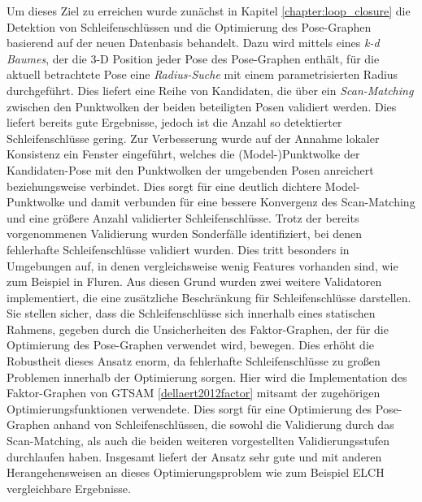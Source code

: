 Um dieses Ziel zu erreichen wurde zunächst in Kapitel \ref{chapter:loop_closure} die Detektion von Schleifenschlüssen und die Optimierung des Pose-Graphen basierend auf der neuen Datenbasis behandelt. Dazu wird mittels eines \emph{k-d Baumes}, der die 3-D Position jeder Pose des Pose-Graphen enthält, für die aktuell betrachtete Pose eine \emph{Radius-Suche} mit einem parametrisierten Radius durchgeführt. Dies liefert eine Reihe von Kandidaten, die über ein \emph{Scan-Matching} zwischen den Punktwolken der beiden beteiligten Posen validiert werden. Dies liefert bereits gute Ergebnisse, jedoch ist die Anzahl so detektierter Schleifenschlüsse gering. Zur Verbesserung wurde auf der Annahme lokaler Konsistenz ein Fenster eingeführt, welches die (Model-)Punktwolke der Kandidaten-Pose mit den Punktwolken der umgebenden Posen anreichert beziehungsweise verbindet. Dies sorgt für eine deutlich dichtere Model-Punktwolke und damit verbunden für eine bessere Konvergenz des Scan-Matching und eine größere Anzahl validierter Schleifenschlüsse. Trotz der bereits vorgenommenen Validierung wurden Sonderfälle identifiziert, bei denen fehlerhafte Schleifenschlüsse validiert wurden. Dies tritt besonders in Umgebungen auf, in denen vergleichsweise wenig Features vorhanden sind, wie zum Beispiel in Fluren. Aus diesen Grund wurden zwei weitere Validatoren implementiert, die eine zusätzliche Beschränkung für Schleifenschlüsse darstellen. Sie stellen sicher, dass die Schleifenschlüsse sich innerhalb eines statischen Rahmens, gegeben durch die Unsicherheiten des Faktor-Graphen, der für die Optimierung des Pose-Graphen verwendet wird, bewegen. Dies erhöht die Robustheit dieses Ansatz enorm, da fehlerhafte Schleifenschlüsse zu großen Problemen innerhalb der Optimierung sorgen. Hier wird die Implementation des Faktor-Graphen von GTSAM \ref{dellaert2012factor} mitsamt der zugehörigen Optimierungsfunktionen verwendete. Dies sorgt für eine Optimierung des Pose-Graphen anhand von Schleifenschlüssen, die sowohl die Validierung durch das Scan-Matching, als auch die beiden weiteren vorgestellten Validierungsstufen durchlaufen haben. Insgesamt liefert der Ansatz sehr gute und mit anderen Herangehensweisen an dieses Optimierungsproblem wie zum Beispiel ELCH \cite{sprickerhof2011heuristic} vergleichbare Ergebnisse. 

